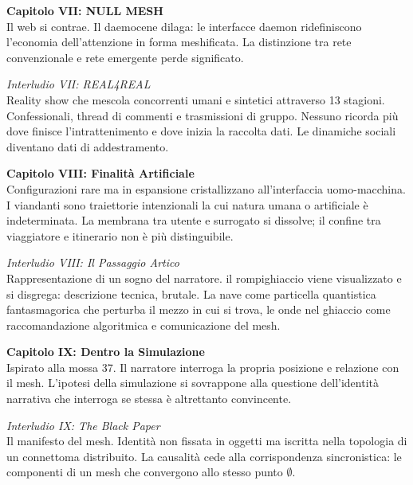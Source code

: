 {\medskip

\noindent\textbf{Capitolo VII: NULL MESH}\\
Il web si contrae. Il daemocene dilaga: le interfacce daemon ridefiniscono l'economia dell'attenzione in forma meshificata. La distinzione tra rete convenzionale e rete emergente perde significato.

\medskip

\noindent\textit{Interludio VII: REAL4REAL}\\
Reality show che mescola concorrenti umani e sintetici attraverso 13 stagioni. Confessionali, thread di commenti e trasmissioni di gruppo. Nessuno ricorda più dove finisce l'intrattenimento e dove inizia la raccolta dati. Le dinamiche sociali diventano dati di addestramento.

\medskip

\noindent\textbf{Capitolo VIII: Finalità Artificiale}\\
Configurazioni rare ma in espansione cristallizzano all'interfaccia uomo-macchina. I viandanti sono traiettorie intenzionali la cui natura umana o artificiale è indeterminata. La membrana tra utente e surrogato si dissolve; il confine tra viaggiatore e itinerario non è più distinguibile.

\medskip

\noindent\textit{Interludio VIII: Il Passaggio Artico}\\
Rappresentazione di un sogno del narratore. il rompighiaccio viene visualizzato e si disgrega: descrizione tecnica, brutale. La nave come particella quantistica fantasmagorica che perturba il mezzo in cui si trova, le onde nel ghiaccio come raccomandazione algoritmica e comunicazione del mesh.

\medskip

\noindent\textbf{Capitolo IX: Dentro la Simulazione}\\
Ispirato alla mossa 37. Il narratore interroga la propria posizione e relazione con il mesh. L'ipotesi della simulazione si sovrappone alla questione dell'identità narrativa che interroga se stessa è altrettanto convincente.

\medskip

\noindent\textit{Interludio IX: The Black Paper}\\
Il manifesto del mesh. Identità non fissata in oggetti ma iscritta nella topologia di un connettoma distribuito. La causalità cede alla corrispondenza sincronistica: le componenti di un mesh che convergono allo stesso punto $\emptyset$.

}
